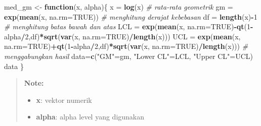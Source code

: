 \documentclass[]{book}
\newenvironment{Shaded}{\begin{snugshade}}{\end{snugshade}}
\newcommand{\KeywordTok}[1]{\textcolor[rgb]{0.13,0.29,0.53}{\textbf{#1}}}
\newcommand{\DataTypeTok}[1]{\textcolor[rgb]{0.13,0.29,0.53}{#1}}
\newcommand{\DecValTok}[1]{\textcolor[rgb]{0.00,0.00,0.81}{#1}}
\newcommand{\FloatTok}[1]{\textcolor[rgb]{0.00,0.00,0.81}{#1}}
\newcommand{\StringTok}[1]{\textcolor[rgb]{0.31,0.60,0.02}{#1}}
\newcommand{\CommentTok}[1]{\textcolor[rgb]{0.56,0.35,0.01}{\textit{#1}}}
\newcommand{\OtherTok}[1]{\textcolor[rgb]{0.56,0.35,0.01}{#1}}
\newcommand{\ControlFlowTok}[1]{\textcolor[rgb]{0.13,0.29,0.53}{\textbf{#1}}}
\newcommand{\OperatorTok}[1]{\textcolor[rgb]{0.81,0.36,0.00}{\textbf{#1}}}
\newcommand{\NormalTok}[1]{#1}
\providecommand{\tightlist}{%
  \setlength{\itemsep}{0pt}\setlength{\parskip}{0pt}}
\begin{document}
\begin{Shaded}
\begin{Highlighting}[]
\NormalTok{med_gm <-}\StringTok{ }\ControlFlowTok{function}\NormalTok{(x, alpha)\{}
\NormalTok{  x =}\StringTok{ }\KeywordTok{log}\NormalTok{(x)}
  \CommentTok{# rata-rata geometrik}
\NormalTok{  gm =}\StringTok{ }\KeywordTok{exp}\NormalTok{(}\KeywordTok{mean}\NormalTok{(x, }\DataTypeTok{na.rm=}\OtherTok{TRUE}\NormalTok{))}
  \CommentTok{# menghitung derajat kebebasan}
\NormalTok{  df =}\StringTok{ }\KeywordTok{length}\NormalTok{(x)}\OperatorTok{-}\DecValTok{1}
  \CommentTok{# menghitung batas bawah dan atas}
\NormalTok{  LCL =}\StringTok{ }\KeywordTok{exp}\NormalTok{(}\KeywordTok{mean}\NormalTok{(x, }\DataTypeTok{na.rm=}\OtherTok{TRUE}\NormalTok{)}\OperatorTok{-}\KeywordTok{qt}\NormalTok{(}\DecValTok{1}\OperatorTok{-}\NormalTok{alpha}\OperatorTok{/}\DecValTok{2}\NormalTok{,df)}\OperatorTok{*}\KeywordTok{sqrt}\NormalTok{(}\KeywordTok{var}\NormalTok{(x, }\DataTypeTok{na.rm=}\OtherTok{TRUE}\NormalTok{)}\OperatorTok{/}\KeywordTok{length}\NormalTok{(x)))}
\NormalTok{  UCL =}\StringTok{ }\KeywordTok{exp}\NormalTok{(}\KeywordTok{mean}\NormalTok{(x, }\DataTypeTok{na.rm=}\OtherTok{TRUE}\NormalTok{)}\OperatorTok{+}\KeywordTok{qt}\NormalTok{(}\DecValTok{1}\OperatorTok{-}\NormalTok{alpha}\OperatorTok{/}\DecValTok{2}\NormalTok{,df)}\OperatorTok{*}\KeywordTok{sqrt}\NormalTok{(}\KeywordTok{var}\NormalTok{(x, }\DataTypeTok{na.rm=}\OtherTok{TRUE}\NormalTok{)}\OperatorTok{/}\KeywordTok{length}\NormalTok{(x)))}
  \CommentTok{# menggabungkan hasil}
\NormalTok{  data=}\KeywordTok{c}\NormalTok{(}\StringTok{"GM"}\NormalTok{=gm,}
        \StringTok{"Lower CL"}\NormalTok{=LCL,}
        \StringTok{"Upper CL"}\NormalTok{=UCL)}
\NormalTok{  data}
\NormalTok{\}}
\end{Highlighting}
\end{Shaded}

\begin{quote}
\textbf{Note: }

\begin{itemize}
\tightlist
\item
  \textbf{x}: vektor numerik
\item
  \textbf{alpha}: alpha level yang digunakan
\end{itemize}
\end{quote}

\begin{Shaded}
\end{Shaded}
\end{document}
